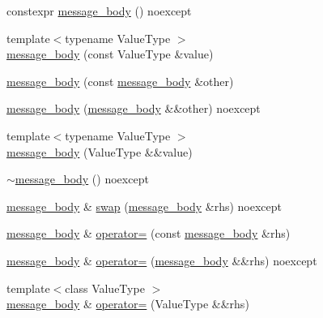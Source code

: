 \begin{DoxyCompactItemize}
\item 
constexpr \hyperlink{classactor__zeta_1_1messaging_1_1message__body_a77305ae40c427a8b0e0736f13def4970}{message\+\_\+body} () noexcept
\item 
{\footnotesize template$<$typename Value\+Type $>$ }\\\hyperlink{classactor__zeta_1_1messaging_1_1message__body_a5fe3cdc95b1497e823b903357d5610e2}{message\+\_\+body} (const Value\+Type \&value)
\item 
\hyperlink{classactor__zeta_1_1messaging_1_1message__body_ae73508f233dd748df02e4e3e1ba65e88}{message\+\_\+body} (const \hyperlink{classactor__zeta_1_1messaging_1_1message__body}{message\+\_\+body} \&other)
\item 
\hyperlink{classactor__zeta_1_1messaging_1_1message__body_a22a07256f9adcc040b95f0c062a6d156}{message\+\_\+body} (\hyperlink{classactor__zeta_1_1messaging_1_1message__body}{message\+\_\+body} \&\&other) noexcept
\item 
{\footnotesize template$<$typename Value\+Type $>$ }\\\hyperlink{classactor__zeta_1_1messaging_1_1message__body_a7b3ecc7aa5e1d6c1dd056fe1877d72d3}{message\+\_\+body} (Value\+Type \&\&value)
\item 
\hyperlink{classactor__zeta_1_1messaging_1_1message__body_a36da931830e90725ea2fa0ce70aac305}{$\sim$message\+\_\+body} () noexcept
\item 
\hyperlink{classactor__zeta_1_1messaging_1_1message__body}{message\+\_\+body} \& \hyperlink{classactor__zeta_1_1messaging_1_1message__body_a0e9291345064f9cad985d4753e2c9de6}{swap} (\hyperlink{classactor__zeta_1_1messaging_1_1message__body}{message\+\_\+body} \&rhs) noexcept
\item 
\hyperlink{classactor__zeta_1_1messaging_1_1message__body}{message\+\_\+body} \& \hyperlink{classactor__zeta_1_1messaging_1_1message__body_acbb3c5093aaf5e477846a6ab122c0f48}{operator=} (const \hyperlink{classactor__zeta_1_1messaging_1_1message__body}{message\+\_\+body} \&rhs)
\item 
\hyperlink{classactor__zeta_1_1messaging_1_1message__body}{message\+\_\+body} \& \hyperlink{classactor__zeta_1_1messaging_1_1message__body_a5c2bf10c6200737e7d0677539ece021f}{operator=} (\hyperlink{classactor__zeta_1_1messaging_1_1message__body}{message\+\_\+body} \&\&rhs) noexcept
\item 
{\footnotesize template$<$class Value\+Type $>$ }\\\hyperlink{classactor__zeta_1_1messaging_1_1message__body}{message\+\_\+body} \& \hyperlink{classactor__zeta_1_1messaging_1_1message__body_a786d239d35a7a23e15fbff2663867e02}{operator=} (Value\+Type \&\&rhs)

\end{DoxyCompactItemize}
